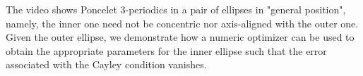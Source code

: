 The video shows Poncelet 3-periodics in a pair of ellipses in "general position", namely,  the inner one need not be concentric nor axis-aligned with the outer one. Given the outer ellipse, we demonstrate how a numeric optimizer can be used to obtain the appropriate parameters for the inner ellipse such that the error associated with the Cayley condition vanishes.